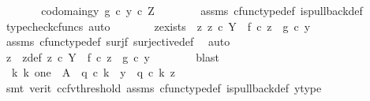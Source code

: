 \begin{isabellebody}
\ \ \ \ \isamarkupfalse%
\ \isamarkupfalse%
\ codomain{\isacharunderscore}{\kern0pt}gy{\isacharcolon}{\kern0pt}\ {\isachardoublequoteopen}g\ {\isasymcirc}\isactrlsub c\ y\ {\isasymin}\isactrlsub c\ Z{\isachardoublequoteclose}\isanewline
\ \ \ \ \ \ \isamarkupfalse%
\ assms{\isacharparenleft}{\kern0pt}{}{\isacharparenright}{\kern0pt}\ cfunc{\isacharunderscore}{\kern0pt}type{\isacharunderscore}{\kern0pt}def\ is{\isacharunderscore}{\kern0pt}pullback{\isacharunderscore}{\kern0pt}def\ \ \isamarkupfalse%
\ {\isacharparenleft}{\kern0pt}typecheck{\isacharunderscore}{\kern0pt}cfuncs{\isacharcomma}{\kern0pt}\ auto{\isacharparenright}{\kern0pt}\isanewline
\ \ \ \ \isamarkupfalse%
\ \isamarkupfalse%
\ z{\isacharunderscore}{\kern0pt}exists{\isacharcolon}{\kern0pt}\ {\isachardoublequoteopen}{\isasymexists}\ z{\isachardot}{\kern0pt}\ z\ {\isasymin}\isactrlsub c\ Y\ {\isasymand}\ f\ {\isasymcirc}\isactrlsub c\ z\ {\isacharequal}{\kern0pt}\ g\ {\isasymcirc}\isactrlsub c\ y{\isachardoublequoteclose}\isanewline
\ \ \ \ \ \ \isamarkupfalse%
\ assms{\isacharparenleft}{\kern0pt}{}{\isacharparenright}{\kern0pt}\ cfunc{\isacharunderscore}{\kern0pt}type{\isacharunderscore}{\kern0pt}def\ surj{\isacharunderscore}{\kern0pt}f\ surjective{\isacharunderscore}{\kern0pt}def\ \isamarkupfalse%
\ auto\isanewline
\ \ \ \ \isamarkupfalse%
\ \isamarkupfalse%
\ z\ \ z{\isacharunderscore}{\kern0pt}def{\isacharcolon}{\kern0pt}\ {\isachardoublequoteopen}z\ {\isasymin}\isactrlsub c\ Y\ {\isasymand}\ f\ {\isasymcirc}\isactrlsub c\ z\ {\isacharequal}{\kern0pt}\ g\ {\isasymcirc}\isactrlsub c\ y{\isachardoublequoteclose}\isanewline
\ \ \ \ \ \ \isamarkupfalse%
\ blast\isanewline
\ \ \ \ \isamarkupfalse%
\ \isamarkupfalse%
\ {\isachardoublequoteopen}{\isasymexists}{\isacharbang}{\kern0pt}\ k{\isachardot}{\kern0pt}\ k{\isacharcolon}{\kern0pt}\ one\ {\isasymrightarrow}\ A\ {\isasymand}\ q{}\ {\isasymcirc}\isactrlsub c\ k\ {\isacharequal}{\kern0pt}\ y\ {\isasymand}\ q{}\ {\isasymcirc}\isactrlsub c\ k\ {\isacharequal}{\kern0pt}z{\isachardoublequoteclose}\isanewline
\ \ \ \ \ \ \isamarkupfalse%
\ {\isacharparenleft}{\kern0pt}smt\ {\isacharparenleft}{\kern0pt}verit{\isacharcomma}{\kern0pt}\ ccfv{\isacharunderscore}{\kern0pt}threshold{\isacharparenright}{\kern0pt}\ assms{\isacharparenleft}{\kern0pt}{}{\isacharparenright}{\kern0pt}\ cfunc{\isacharunderscore}{\kern0pt}type{\isacharunderscore}{\kern0pt}def\ is{\isacharunderscore}{\kern0pt}pullback{\isacharunderscore}{\kern0pt}def\ y{\isacharunderscore}{\kern0pt}type{\isacharparenright}{\kern0pt}\isanewline

\end{isabellebody}
